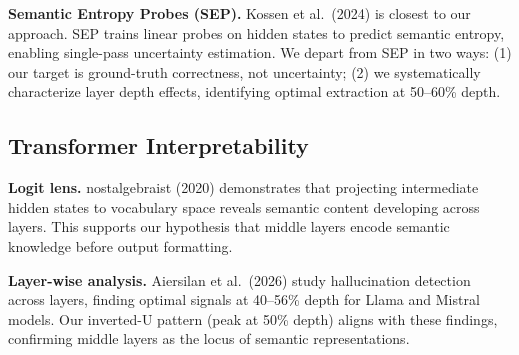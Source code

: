 \textbf{Semantic Entropy Probes (SEP).} Kossen et al.\ (2024) is closest to our approach. SEP trains linear probes on hidden states to predict semantic entropy, enabling single-pass uncertainty estimation. We depart from SEP in two ways: (1) our target is ground-truth correctness, not uncertainty; (2) we systematically characterize layer depth effects, identifying optimal extraction at 50--60\% depth.

\subsection{Transformer Interpretability}

\textbf{Logit lens.} nostalgebraist (2020) demonstrates that projecting intermediate hidden states to vocabulary space reveals semantic content developing across layers. This supports our hypothesis that middle layers encode semantic knowledge before output formatting.

\textbf{Layer-wise analysis.} Aiersilan et al.\ (2026) study hallucination detection across layers, finding optimal signals at 40--56\% depth for Llama and Mistral models. Our inverted-U pattern (peak at 50\% depth) aligns with these findings, confirming middle layers as the locus of semantic representations.
